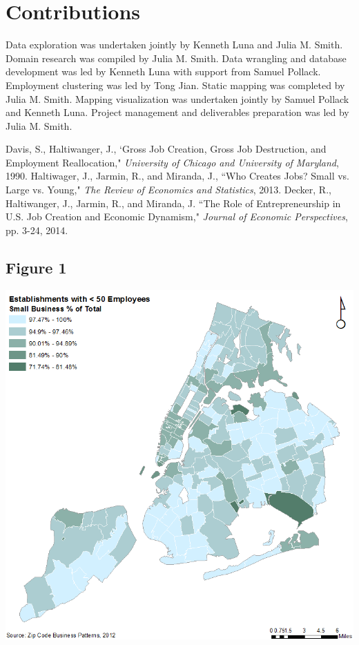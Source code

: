 \documentclass[article, 11pt]{article} %
\begin{document}
\section*{Contributions}

Data exploration was undertaken jointly by Kenneth Luna and Julia M. Smith. Domain research was compiled by Julia M. Smith. Data wrangling and database development was led by Kenneth Luna with support from Samuel Pollack. Employment clustering was led by Tong Jian. Static mapping was completed by Julia M. Smith. Mapping visualization was undertaken jointly by Samuel Pollack and Kenneth Luna. Project management and deliverables preparation was led by Julia M. Smith. 

\pagebreak

\begin{thebibliography}{100}
 Davis, S., Haltiwanger, J., `Gross Job Creation, Gross Job Destruction, and Employment Reallocation," \emph{University of Chicago and University of Maryland}, 1990.
 Haltiwager, J., Jarmin, R., and Miranda, J., ``Who Creates Jobs? Small vs. Large vs. Young," \emph{The Review of Economics and Statistics}, 2013.
 Decker, R., Haltiwanger, J., Jarmin, R., and Miranda, J. ``The Role of Entrepreneurship in U.S. Job Creation and Economic Dynamism," \emph{Journal of Economic Perspectives}, pp. 3-24, 2014.
\end{thebibliography}


\subsection*{Figure 1}
\includegraphics[width=1.0\textwidth]{1}
\\\\
\pagebreak
\end{document}
